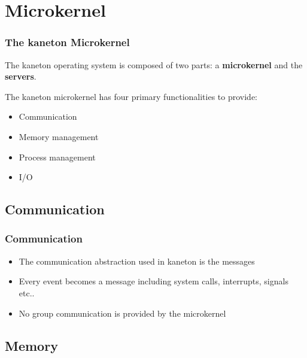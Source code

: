 \documentclass[8pt]{beamer}
\newcommand{\nl}[0]{\vspace{0.4cm}}
\begin{document}
%
%

\section{Microkernel}


\begin{frame}
  \frametitle{The kaneton Microkernel}

  The kaneton operating system is composed of two parts: a
  \textbf{microkernel} and the \textbf{servers}.

  \nl

  The kaneton microkernel has four primary functionalities
  to provide:

  \begin{itemize}[<+->]
    \item
      Communication
    \item
      Memory management
    \item
      Process management
    \item
      I/O
  \end{itemize}
\end{frame}

%
%

\subsection{Communication}


\begin{frame}
  \frametitle{Communication}

  \begin{itemize}[<+->]
    \item
      The communication abstraction used in kaneton is the messages
    \item
      Every event becomes a message including system calls, interrupts,
      signals etc..
    \item
      No group communication is provided by the microkernel
  \end{itemize}
\end{frame}

%
%

\subsection{Memory}

\end{document}
